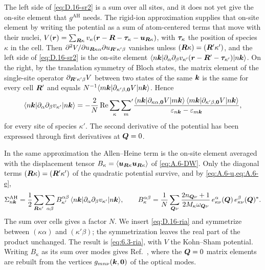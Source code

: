 The left side of \cref{eq:D.16-sr2} is a sum over all sites, and it does not yet give the on-site element that $g^{\mathrm{AH}}$ needs. The rigid-ion approximation supplies that on-site element by writing the potential as a sum of atom-centered terms that move with their nuclei, $V(\bm{r}) = \sum_{\bm{R}\kappa}v_\kappa(\bm{r} - \bm{R} - \bm{\tau}_\kappa - \bm{u}_{\bm{R}\kappa})$, with $\bm{\tau}_\kappa$ the position of species $\kappa$ in the cell. Then $\partial^2V/\partial u_{\bm{R}\kappa\alpha}\partial u_{\bm{R}'\kappa'\beta}$ vanishes unless $(\bm{R}\kappa) = (\bm{R}'\kappa')$, and the left side of \cref{eq:D.16-sr2} is the on-site element $\langle n\bm{k}|\partial_\alpha\partial_\beta v_{\kappa'}(\bm{r} - \bm{R}' - \bm{\tau}_{\kappa'})|n\bm{k}\rangle$. On the right, by the translation symmetry of Bloch states, the matrix element of the single-site operator $\partial_{\bm{R}'\kappa'\beta}V$ between two states of the same $\bm{k}$ is the same for every cell $\bm{R}'$ and equals $N^{-1}\langle m\bm{k}|\partial_{\kappa'\beta,\bm{0}}V|n\bm{k}\rangle$. Hence
\begin{equation}
  \langle n\bm{k}|\partial_\alpha\partial_\beta v_{\kappa'}|n\bm{k}\rangle = -\frac{2}{N}\operatorname{Re}\sum_\kappa{\sum_m}'\frac{\langle n\bm{k}|\partial_{\kappa\alpha,\bm{0}}V|m\bm{k}\rangle\,\langle m\bm{k}|\partial_{\kappa'\beta,\bm{0}}V|n\bm{k}\rangle}{\varepsilon_{n\bm{k}} - \varepsilon_{m\bm{k}}} ,
  \label{eq:D.16-ria}
\end{equation}
for every site of species $\kappa'$. The second derivative of the potential has been expressed through first derivatives at $\bm{Q} = 0$.

In the same approximation the Allen--Heine term is the on-site element averaged with the displacement tensor $B_\kappa = \langle\bm{u}_{\bm{R}\kappa}\bm{u}_{\bm{R}\kappa}\rangle$ of \cref{eq:A.6-DW}. Only the diagonal terms $(\bm{R}\kappa) = (\bm{R}'\kappa')$ of the quadratic potential survive, and by \cref{eq:A.6-u,eq:A.6-e},
\begin{equation*}
  \Sigma^{\mathrm{AH}}_{n\bm{k}} = \frac12\sum_{\bm{R}\kappa'}\sum_{\alpha\beta}B^{\alpha\beta}_{\kappa'}\,\langle n\bm{k}|\partial_\alpha\partial_\beta v_{\kappa'}|n\bm{k}\rangle, \qquad
  B^{\alpha\beta}_\kappa = \frac1N\sum_{\bm{Q}\nu}\frac{2n_{\bm{Q}\nu} + 1}{2M_\kappa\omega_{\bm{Q}\nu}}\,e^\alpha_{\kappa\nu}(\bm{Q})\,e^\beta_{\kappa\nu}(\bm{Q})^* .
\end{equation*}
The sum over cells gives a factor $N$. We insert \cref{eq:D.16-ria} and symmetrize between $(\kappa\alpha)$ and $(\kappa'\beta)$; the symmetrization leaves the real part of the product unchanged. The result is \cref{eq:6.3-ria}, with $V$ the Kohn--Sham potential. Writing $B_\kappa$ as its sum over modes gives Ref.~\cite[Eqs.~(195)--(198)]{giustino2017electron}, where the $\bm{Q} = 0$ matrix elements are rebuilt from the vertices $g_{mn\nu}(\bm{k},\bm{0})$ of the optical modes.
